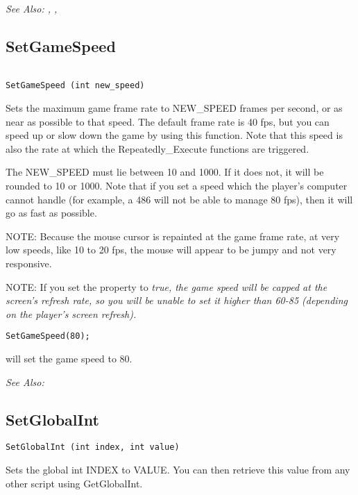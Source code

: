 \it{See Also:} ,
, 


\subsection{SetGameSpeed}\label{SetGameSpeed}%

\begin{verbatim}

SetGameSpeed (int new_speed)
\end{verbatim}
Sets the maximum game frame rate to NEW_SPEED frames per second, or as near as possible
to that speed. The default frame rate is 40 fps, but you can speed up or
slow down the game by using this function. Note that this speed is also the
rate at which the Repeatedly_Execute functions are triggered.

The NEW_SPEED must lie between 10 and 1000. If it does not, it will be rounded
to 10 or 1000. Note that if you set a speed which the player's computer cannot
handle (for example, a 486 will not be able to manage 80 fps), then it will
go as fast as possible.

NOTE: Because the mouse cursor is repainted at the game frame rate, at very
low speeds, like 10 to 20 fps, the mouse will appear to be jumpy and not
very responsive.

NOTE: If you set the  property to \it{true}, the game speed will be capped
at the screen's refresh rate, so you will be unable to set it higher than 60-85 (depending
on the player's screen refresh).

\begin{verbatim}
SetGameSpeed(80);
\end{verbatim}
will set the game speed to 80.

\it{See Also:} 


\subsection{SetGlobalInt}\label{SetGlobalInt}%

\begin{verbatim}
SetGlobalInt (int index, int value)
\end{verbatim}
Sets the global int INDEX to VALUE. You can then retrieve this value
from any other script using GetGlobalInt.

